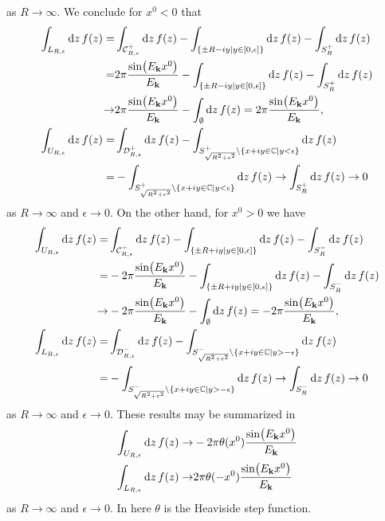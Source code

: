 \documentclass{article}
\begin{document}
as $R\rightarrow\infty$.
We conclude for $x^0<0$ that
\begin{align}
\begin{split}
\int_{L_{R,\epsilon}}\dd{z}f(z)=&\int_{\mathcal{C}^+_{R,\epsilon}}\dd{z}f(z)-\int_{\{\pm R-iy|y\in[0,\epsilon]\}}\dd{z}f(z)-\int_{S^+_R}\dd{z}f(z)\\
=&2\pi \frac{\sin(E_{\vb{k}}x^0)}{E_{\vb{k}}}-\int_{\{\pm R-iy|y\in[0,\epsilon]\}}\dd{z}f(z)-\int_{S^+_R}\dd{z}f(z)\\
\rightarrow &2\pi \frac{\sin(E_{\vb{k}}x^0)}{E_{\vb{k}}}-\int_{\emptyset}\dd{z}f(z)=2\pi \frac{\sin(E_{\vb{k}}x^0)}{E_{\vb{k}}},\\
\int_{U_{R,\epsilon}}\dd{z}f(z)=&\int_{\mathcal{D}^+_{R,\epsilon}}\dd{z}f(z)-\int_{S^+_{\sqrt{R^2+\epsilon^2}}\setminus\{x+iy\in\mathbb{C}|y<\epsilon\}}\dd{z}f(z)\\
=&-\int_{S^+_{\sqrt{R^2+\epsilon^2}}\setminus\{x+iy\in\mathbb{C}|y<\epsilon\}}\dd{z}f(z)\rightarrow\int_{S^+_{R}}\dd{z}f(z)\rightarrow 0
\end{split}
\end{align}
as $R\rightarrow\infty$ and $\epsilon\rightarrow 0$. On the other hand, for $x^0>0$ we have
\begin{align}
\begin{split}
\int_{U_{R,\epsilon}}\dd{z}f(z)=&\int_{\mathcal{C}^-_{R,\epsilon}}\dd{z}f(z)-\int_{\{\pm R+iy|y\in[0,\epsilon]\}}\dd{z}f(z)-\int_{S^-_R}\dd{z}f(z)\\
=&-2\pi \frac{\sin(E_{\vb{k}}x^0)}{E_{\vb{k}}}-\int_{\{\pm R+iy|y\in[0,\epsilon]\}}\dd{z}f(z)-\int_{S^-_R}\dd{z}f(z)\\
\rightarrow &-2\pi \frac{\sin(E_{\vb{k}}x^0)}{E_{\vb{k}}}-\int_{\emptyset}\dd{z}f(z)=-2\pi \frac{\sin(E_{\vb{k}}x^0)}{E_{\vb{k}}},\\
\int_{L_{R,\epsilon}}\dd{z}f(z)=&\int_{\mathcal{D}^-_{R,\epsilon}}\dd{z}f(z)-\int_{S^-_{\sqrt{R^2+\epsilon^2}}\setminus\{x+iy\in\mathbb{C}|y>-\epsilon\}}\dd{z}f(z)\\
=&-\int_{S^-_{\sqrt{R^2+\epsilon^2}}\setminus\{x+iy\in\mathbb{C}|y>-\epsilon\}}\dd{z}f(z)\rightarrow\int_{S^-_{R}}\dd{z}f(z)\rightarrow 0
\end{split}
\end{align}
as $R\rightarrow\infty$ and $\epsilon\rightarrow 0$. These results may be summarized in
\begin{align}
\begin{split}
\int_{U_{R,\epsilon}}\dd{z}f(z)\rightarrow&-2\pi \theta(x^0)\frac{\sin(E_{\vb{k}}x^0)}{E_{\vb{k}}}\\
\int_{L_{R,\epsilon}}\dd{z}f(z)\rightarrow &2\pi \theta(-x^0)\frac{\sin(E_{\vb{k}}x^0)}{E_{\vb{k}}}
\end{split}
\end{align}
as $R\rightarrow\infty$ and $\epsilon\rightarrow 0$. In here $\theta$ is the Heaviside step function. 
\end{document}

